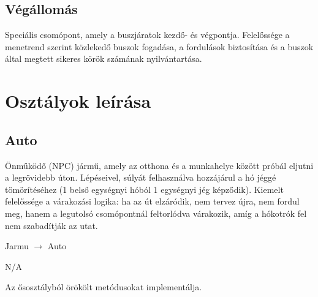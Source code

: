 \subsection{Végállomás}
\par{Speciális csomópont, amely a buszjáratok kezdő- és végpontja. Felelőssége a menetrend szerint közlekedő buszok fogadása, a fordulások biztosítása és a buszok által megtett sikeres körök számának nyilvántartása.}


\section{Osztályok leírása}

\subsection{Auto}
\begin{class-template-responsibility}
   Önműködő (NPC) jármű, amely az otthona és a munkahelye között próbál eljutni a legrövidebb úton. Lépéseivel, súlyát felhasználva hozzájárul a hó jéggé tömörítéséhez (1 belső egységnyi hóból 1 egységnyi jég képződik). Kiemelt felelőssége a várakozási logika: ha az út elzáródik, nem tervez újra, nem fordul meg, hanem a legutolsó csomópontnál feltorlódva várakozik, amíg a hókotrók fel nem szabadítják az utat.
\end{class-template-responsibility}
\begin{class-template-baseclass}
    Jarmu $\rightarrow$ Auto
\end{class-template-baseclass}
\begin{class-template-interface}
    N/A
\end{class-template-interface}
\begin{class-template-attribute}
\end{class-template-attribute}
\begin{class-template-method}
    Az ősosztályból örökölt metódusokat implementálja.
\end{class-template-method}

